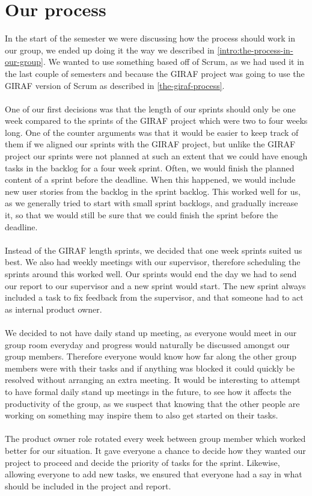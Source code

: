 \section{Our process}
In the start of the semester we were discussing how the process should work in our group, we ended up doing it the way we described in \autoref{intro:the-process-in-our-group}.
We wanted to use something based off of Scrum, as we had used it in the last couple of semesters and because the GIRAF project was going to use the GIRAF version of Scrum as described in \autoref{the-giraf-process}.
\\\\
One of our first decisions was that the length of our sprints should only be one week compared to the sprints of the GIRAF project which were two to four weeks long.
One of the counter arguments was that it would be easier to keep track of them if we aligned our sprints with the GIRAF project, but unlike the GIRAF project our sprints were not planned at such an extent that we could have enough tasks in the backlog for a four week sprint.
Often, we would finish the planned content of a sprint before the deadline.
When this happened, we would include new user stories from the backlog in the sprint backlog. 
This worked well for us, as we generally tried to start with small sprint backlogs, and gradually increase it, so that we would still be sure that we could finish the sprint before the deadline.
\\\\
Instead of the GIRAF length sprints, we decided that one week sprints suited us best.
We also had weekly meetings with our supervisor, therefore scheduling the sprints around this worked well.
Our sprints would end the day we had to send our report to our supervisor and a new sprint would start.
The new sprint always included a task to fix feedback from the supervisor, and that someone had to act as internal product owner.
\\\\
We decided to not have daily stand up meeting, as everyone would meet in our group room everyday and progress would naturally be discussed amongst our group members.
Therefore everyone would know how far along the other group members were with their tasks and if anything was blocked it could quickly be resolved without arranging an extra meeting.
It would be interesting to attempt to have formal daily stand up meetings in the future, to see how it affects the productivity of the group, as we suspect that knowing that the other people are working on something may inspire them to also get started on their tasks.
\\\\
The product owner role rotated every week between group member which worked better for our situation. 
It gave everyone a chance to decide how they wanted our project to proceed and decide the priority of tasks for the sprint.
Likewise, allowing everyone to add new tasks, we ensured that everyone had a say in what should be included in the project and report.
